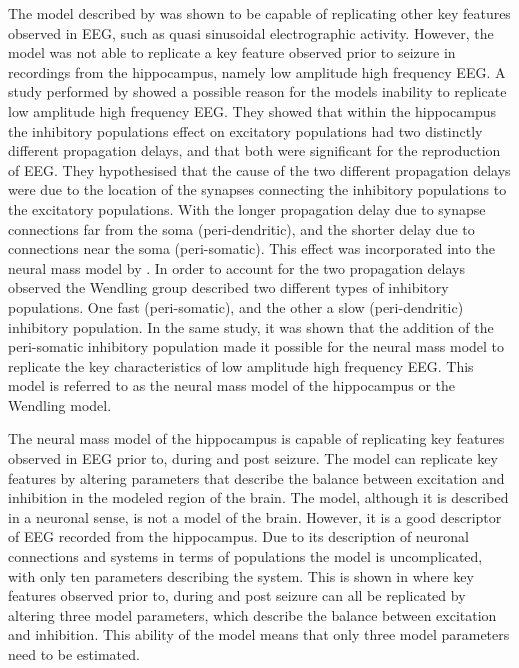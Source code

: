 The model described by \cite{jansen1995electroencephalogram} was shown to be capable of replicating other key features observed in EEG, such as quasi sinusoidal electrographic activity. However, the model was not able to replicate a key feature observed prior to seizure in recordings from the hippocampus, namely low amplitude high frequency EEG. A study performed by \cite{white2000networks} showed a possible reason for the models inability to replicate low amplitude high frequency EEG. They showed that within the hippocampus the inhibitory populations effect on excitatory populations had two distinctly different propagation delays, and that both were significant for the reproduction of EEG. They hypothesised that the cause of the two different propagation delays were due to the location of the synapses connecting the inhibitory populations to the excitatory populations. With the longer propagation delay due to synapse connections far from the soma (peri-dendritic), and the shorter delay due to connections near the soma (peri-somatic).  This effect was incorporated into the neural mass model by \cite{wendling2002epileptic}. In order to account for the two propagation delays observed the Wendling group described two different types of inhibitory populations. One fast (peri-somatic), and the other a slow (peri-dendritic) inhibitory population. In the same study, it was shown that the addition of the peri-somatic inhibitory population made it possible for the neural mass model to replicate the key characteristics of low amplitude high frequency EEG. This model is referred to as the neural mass model of the hippocampus or the Wendling model.


The neural mass model of the hippocampus is capable of replicating key features observed in EEG prior to, during and post seizure. The model can replicate key features by altering parameters that describe the balance between excitation and inhibition in the modeled region of the brain. The model, although it is described in a neuronal sense, is not a model of the brain. However, it is a good descriptor of EEG recorded from the hippocampus. Due to its description of neuronal connections and systems in terms of populations the model is uncomplicated, with only ten parameters describing the system. This is shown in \cite{wendling2002epileptic} where key features observed prior to, during and post seizure can all be replicated by altering three model parameters, which describe the balance between excitation and inhibition. This ability of the model means that only three model parameters need to be estimated.

